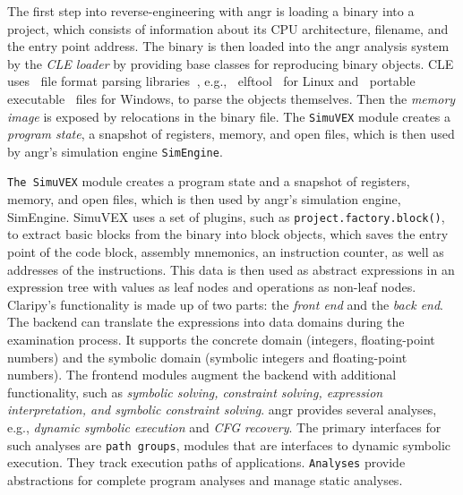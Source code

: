 \documentclass[seminar]{plai}
\begin{document}
The first step into reverse-engineering with angr is loading a binary into a project, which consists of information about its CPU architecture, filename, and the entry point address.\cite{core-concepts} The binary is then loaded into the angr analysis system by the \textit{CLE loader} by providing base classes for reproducing binary objects.
CLE uses file format parsing libraries, e.g., elftool for Linux and portable executable files for Windows, to parse the objects themselves.
Then the \textit{memory image} is exposed by relocations in the binary file.\cite{art-of-war-angr}
The \texttt{SimuVEX} module creates a \textit{program state}, a snapshot of registers, memory, and open files, which is then used by angr's simulation engine \texttt{SimEngine}.

\texttt{The SimuVEX} module creates a program state and a snapshot of registers, memory, and open files, which is then used by angr's simulation engine, SimEngine. SimuVEX uses a set of plugins, such as \texttt{project.factory.block()}, to extract basic blocks from the binary into block objects, which saves the entry point of the code block, assembly mnemonics, an instruction counter, as well as addresses of the instructions.\cite{art-of-war-angr} This data is then used as abstract expressions in an expression tree with values as leaf nodes and operations as non-leaf nodes.\\

Claripy's functionality is made up of two parts: the \textit{front end} and the \textit{back end}. The backend can translate the expressions into data domains during the examination process. It supports the concrete domain (integers, floating-point numbers) and the symbolic domain (symbolic integers and floating-point numbers).
The frontend modules augment the backend with additional functionality, such as \textit{symbolic solving, constraint solving, expression interpretation, and symbolic constraint solving}.
angr provides several analyses, e.g., \textit{dynamic symbolic execution} and \textit{CFG recovery}. The primary interfaces for such analyses are \texttt{path groups}, modules that are interfaces to dynamic symbolic execution. They track execution paths of applications. \texttt{Analyses} provide abstractions for complete program analyses and manage static analyses.
\end{document}
